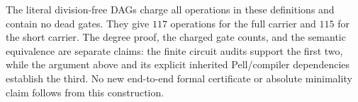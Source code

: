 The literal division-free DAGs charge all operations in these definitions
and contain no dead gates. They give $117$ operations for the full
carrier and $115$ for the short carrier. The degree proof, the charged
gate counts, and the semantic equivalence are separate claims: the
finite circuit audits support the first two, while the argument above
and its explicit inherited Pell/compiler dependencies establish the
third. No new end-to-end formal certificate or absolute minimality
claim follows from this construction.
